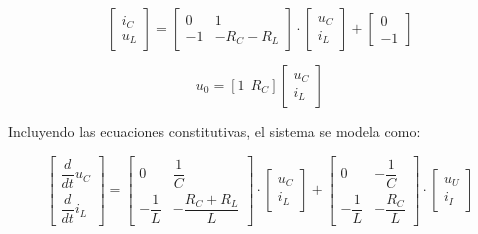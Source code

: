 \vspace{-0.5cm}
\begin{equation}
    \begin{bmatrix}
        i_C \\
        u_L
    \end{bmatrix}
    =
    \begin{bmatrix}
        0 & 1 \\
        -1 & -R_C - R_L
    \end{bmatrix}
    \cdot
    \begin{bmatrix}
        u_C \\
        i_L
    \end{bmatrix}
    +
    \begin{bmatrix}
        0 \\
        -1
    \end{bmatrix}
\end{equation}


\begin{equation}
        u_0 = [1 \ \ R_C] 
    \begin{bmatrix}
        u_C \\
        i_L
    \end{bmatrix}
\end{equation}

Incluyendo las ecuaciones constitutivas, el sistema se modela como:

\vspace{-0.5cm}
\begin{equation}
    \begin{bmatrix}
        \dfrac{d}{dt}u_C\\
        \dfrac{d}{dt}i_L
    \end{bmatrix}
    =
    \begin{bmatrix}
        0 & \dfrac{1}{C}\\
        -\dfrac{1}{L} & -\dfrac{R_C + R_L}{L}
    \end{bmatrix}
    \cdot
    \begin{bmatrix}
        u_C\\
        i_L
    \end{bmatrix}
    +
    \begin{bmatrix}
        0 & -\dfrac{1}{C}\\
        -\dfrac{1}{L} & -\dfrac{R_C}{L}
    \end{bmatrix}
    \cdot
    \begin{bmatrix}
        u_U\\
        i_I
    \end{bmatrix}  
\end{equation}

